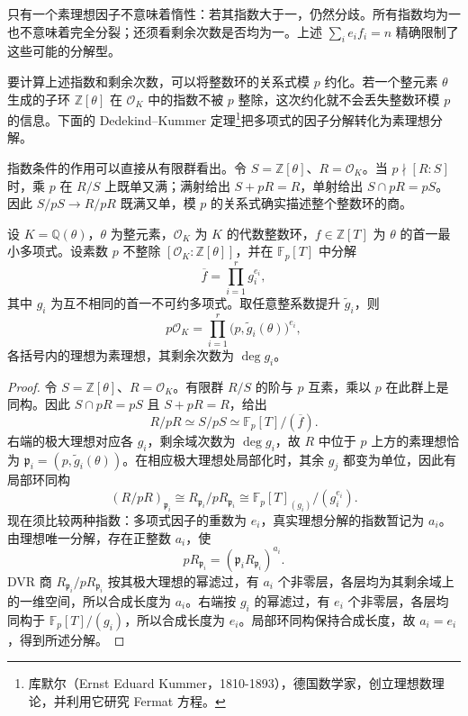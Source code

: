 只有一个素理想因子不意味着惰性：若其指数大于一，仍然分歧。所有指数均为一也不意味着完全分裂；还须看剩余次数是否均为一。上述 \(\sum_i e_if_i=n\) 精确限制了这些可能的分解型。

要计算上述指数和剩余次数，可以将整数环的关系式模 \(p\) 约化。若一个整元素 \(\theta\) 生成的子环 \(\mathbb Z[\theta]\) 在 \(\mathcal O_K\) 中的指数不被 \(p\) 整除，这次约化就不会丢失整数环模 \(p\) 的信息。下面的 Dedekind--Kummer 定理\footnote{库默尔（Ernst Eduard Kummer，1810-1893），德国数学家，创立理想数理论，并利用它研究 Fermat 方程。}把多项式的因子分解转化为素理想分解。

指数条件的作用可以直接从有限群看出。令 \(S=\mathbb Z[\theta]\)、\(R=\mathcal O_K\)。当 \(p\nmid[R:S]\) 时，乘 \(p\) 在 \(R/S\) 上既单又满；满射给出 \(S+pR=R\)，单射给出 \(S\cap pR=pS\)。因此 \(S/pS\longrightarrow R/pR\) 既满又单，模 \(p\) 的关系式确实描述整个整数环的商。

\begin{proposition}\label{b3:prop:monogenic-prime-factorization}
	设 \(K=\mathbb Q(\theta)\)，\(\theta\) 为整元素，\(\mathcal O_K\) 为 \(K\) 的代数整数环，\(f\in\mathbb Z[T]\) 为 \(\theta\) 的首一最小多项式。设素数 \(p\) 不整除 \([\mathcal O_K:\mathbb Z[\theta]]\)，并在 \(\mathbb F_p[T]\) 中分解
	\[
		\overline f=\prod_{i=1}^r g_i^{e_i},
	\]
	其中 \(g_i\) 为互不相同的首一不可约多项式。取任意整系数提升 \(\widetilde g_i\)，则
	\[
		p\mathcal O_K=\prod_{i=1}^r \bigl(p,\widetilde g_i(\theta)\bigr)^{e_i},
	\]
	各括号内的理想为素理想，其剩余次数为 \(\deg g_i\)。
\end{proposition}
\begin{proof}
	令 \(S=\mathbb Z[\theta]\)、\(R=\mathcal O_K\)。有限群 \(R/S\) 的阶与 \(p\) 互素，乘以 \(p\) 在此群上是同构。因此 \(S\cap pR=pS\) 且 \(S+pR=R\)，给出
	\[
		R/pR\simeq S/pS\simeq\mathbb F_p[T]/(\overline f).
	\]
	右端的极大理想对应各 \(g_i\)，剩余域次数为 \(\deg g_i\)，故 \(R\) 中位于 \(p\) 上方的素理想恰为 \(\mathfrak p_i=(p,\widetilde g_i(\theta))\)。在相应极大理想处局部化时，其余 \(g_j\) 都变为单位，因此有局部环同构
	\[
		(R/pR)_{\mathfrak p_i} \cong R_{\mathfrak p_i}/pR_{\mathfrak p_i} \cong\mathbb F_p[T]_{(g_i)}/(g_i^{e_i}).
	\]
	现在须比较两种指数：多项式因子的重数为 \(e_i\)，真实理想分解的指数暂记为 \(a_i\)。由理想唯一分解，存在正整数 \(a_i\)，使
	\[
		pR_{\mathfrak p_i} =(\mathfrak p_iR_{\mathfrak p_i})^{a_i}.
	\]
	DVR 商 \(R_{\mathfrak p_i}/pR_{\mathfrak p_i}\) 按其极大理想的幂滤过，有 \(a_i\) 个非零层，各层均为其剩余域上的一维空间，所以合成长度为 \(a_i\)。右端按 \(g_i\) 的幂滤过，有 \(e_i\) 个非零层，各层均同构于 \(\mathbb F_p[T]/(g_i)\)，所以合成长度为 \(e_i\)。局部环同构保持合成长度，故 \(a_i=e_i\)，得到所述分解。
\end{proof}

